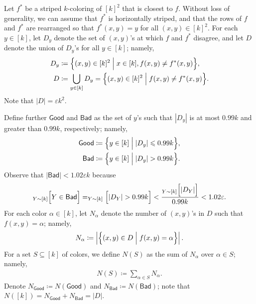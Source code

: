\documentclass[11pt,fleqn]{article}
\renewcommand{\leq}{\leqslant}
\renewcommand{\epsilon}{\varepsilon}
\newcommand{\defeq}{\coloneq}
\let\E\relax\DeclareMathOperator*{\E}{\mathbb{E}}  \let\Pr\relax\DeclareMathOperator*{\Pr}{\mathbb{Pr}}
\newcommand{\f}{f}
\newcommand{\Good}{\mathsf{Good}}
\newcommand{\Bad}{\mathsf{Bad}}
\let\Pr\relax\DeclareMathOperator*{\Pr}{\mathbb{P}}
\theoremstyle{definition}
\numberwithin{equation}{section}
\begin{document}
Let $\f^*$ be a striped $k$-coloring of $[k]^2$ that is closest to $\f$.
Without loss of generality, we can assume that
$\f^*$ is horizontally striped, and that
the rows of $\f$ and $\f^*$ are rearranged so that
$\f^*(x,y) = y$ for all $(x,y) \in [k]^2$.
For each $y \in [k]$, let $D_y$ denote the set of $(x,y)$'s at which
$\f$ and $\f^*$ disagree, and
let $D$ denote the union of $D_y$'s for all $y \in [k]$; namely,
\begin{align}
\begin{aligned}
    D_y & \defeq \Bigl\{
        (x,y) \in [k]^2 \Bigm| x \in [k], \f(x,y) \neq \f^*(x,y)
    \Bigr\}, \\
    D & \defeq \bigcup_{y \in [k]} D_y
    = \Bigl\{
    (x,y) \in [k]^2 \Bigm| \f(x,y) \neq \f^*(x,y)
    \Bigr\}.
\end{aligned}
\end{align}
Note that $|D| = \epsilon k^2$.


Define further
    $\Good$ and $\Bad$ as the set of $y$'s such that
    $|D_y|$ is at most $0.99k$ and greater than $0.99k$, respectively; namely,
\begin{align}
\begin{aligned}
    \Good & \defeq \Bigl\{
        y \in [k] \Bigm| |D_y| \leq 0.99 k
    \Bigr\}, \\
    \Bad & \defeq \Bigl\{
        y \in [k] \Bigm| |D_y| > 0.99 k
    \Bigr\}.
\end{aligned}
\end{align}
Observe that $|\Bad| < 1.02 \epsilon k$ because
\begin{align}
    \Pr_{Y \sim [k]}\Bigl[Y \in \Bad\Bigr]
    = \Pr_{Y \sim [k]}\Bigl[|D_Y| > 0.99 k\Bigr]
    < \frac{\displaystyle \E_{Y \sim [k]}\Bigl[|D_Y|\Bigr]}{0.99 k}
    < 1.02 \epsilon.
\end{align}
For each color $\alpha \in [k]$, let $N_\alpha$ denote
the number of $(x,y)$'s in $D$ such that $\f(x,y) = \alpha$; namely,
\begin{align}
    N_\alpha \defeq \left|\Bigl\{
        (x,y) \in D \Bigm| \f(x,y) = \alpha
    \Bigr\}\right|.
\end{align}
For a set $S \subseteq [k]$ of colors,
we define $N(S)$ as the sum of $N_\alpha$ over $\alpha \in S$; namely,
\begin{align}
    N(S) \defeq \sum_{\alpha \in S} N_\alpha.
\end{align}
Denote
$N_\Good \defeq N(\Good)$ and $N_\Bad \defeq N(\Bad)$;
note that $N([k]) = N_\Good + N_\Bad = |D|$.
\end{document}
